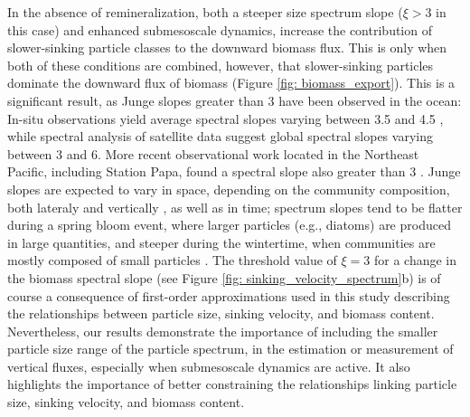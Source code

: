 \documentclass[article,linenumbers]{agujournal2019}
\begin{document}
	In the absence of remineralization, both a steeper size spectrum slope ($\xi>3$ in this case) and enhanced submesoscale dynamics, increase the contribution of slower-sinking particle classes to the downward biomass flux.
	This is only when both of these conditions are combined, however, that slower-sinking particles dominate the downward flux of biomass (Figure \ref{fig: biomass_export}).
	This is a significant result, as Junge slopes greater than 3 have been observed in the ocean: In-situ observations yield average spectral slopes varying between 3.5 and 4.5 \cite<see Table 2 in >{Kostadinov_2009}, while spectral analysis of satellite data suggest global spectral slopes varying between 3 and 6. More recent observational work located in the Northeast Pacific, including Station Papa, found a spectral slope also greater than 3 \cite{White_2015, Cram_2018}.
    Junge slopes are expected to vary in space, depending on the community composition, both lateraly and vertically \cite{Kostadinov_2009, White_2015}, as well as in time; spectrum slopes tend to be flatter during a spring bloom event, where larger particles (e.g., diatoms) are produced in large quantities, and steeper during the wintertime, when communities are mostly composed of small particles \cite{Parsons_1988, Dale_1999, Behrenfeld_2010}.
    The threshold value of $\xi =3$ for a change in the biomass spectral slope (see Figure \ref{fig: sinking_velocity_spectrum}b) is of course a consequence of first-order approximations used in this study describing the relationships between particle size, sinking velocity, and biomass content. Nevertheless, our results demonstrate the importance of including the smaller particle size range of the particle spectrum,  in the estimation or measurement of vertical fluxes, especially when submesoscale dynamics are active. It also highlights the importance of better constraining the relationships linking particle size, sinking velocity, and biomass content.
\end{document}
